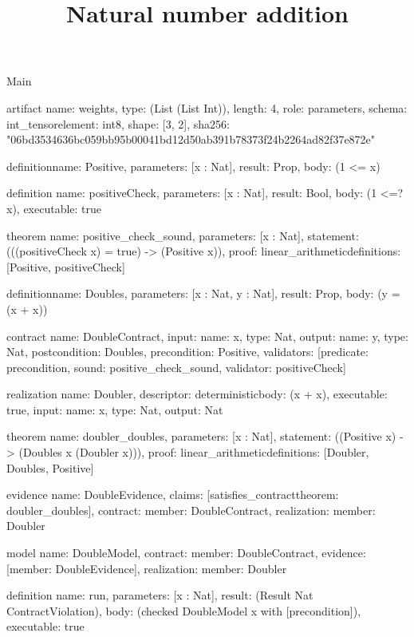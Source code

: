 \begin{lexlean}{Main}
\title{Natural number addition}
\begin{semanticmodule}
artifact{
  name: weights,
  type: (List (List Int)),
  length: 4,
  role: parameters,
  schema: int_tensor{element: int8, shape: [3, 2]},
  sha256: "06bd3534636bc059bb95b00041bd12d50ab391b78373f24b2264ad82f37e872e"
}

definition{name: Positive, parameters: [x : Nat], result: Prop, body: (1 <= x)}

definition{
  name: positiveCheck,
  parameters: [x : Nat],
  result: Bool,
  body: (1 <=? x),
  executable: true
}

theorem{
  name: positive_check_sound,
  parameters: [x : Nat],
  statement: (((positiveCheck x) = true) -> (Positive x)),
  proof: linear_arithmetic{definitions: [Positive, positiveCheck]}
}

definition{name: Doubles, parameters: [x : Nat, y : Nat], result: Prop, body: (y = (x + x))}

contract{
  name: DoubleContract,
  input: {name: x, type: Nat},
  output: {name: y, type: Nat},
  postcondition: Doubles,
  precondition: Positive,
  validators: [{predicate: precondition, sound: positive_check_sound, validator: positiveCheck}]
}

realization{
  name: Doubler,
  descriptor: deterministic{body: (x + x)},
  executable: true,
  input: {name: x, type: Nat},
  output: Nat
}

theorem{
  name: doubler_doubles,
  parameters: [x : Nat],
  statement: ((Positive x) -> (Doubles x (Doubler x))),
  proof: linear_arithmetic{definitions: [Doubler, Doubles, Positive]}
}

evidence{
  name: DoubleEvidence,
  claims: [satisfies_contract{theorem: doubler_doubles}],
  contract: {member: DoubleContract},
  realization: {member: Doubler}
}

model{
  name: DoubleModel,
  contract: {member: DoubleContract},
  evidence: [{member: DoubleEvidence}],
  realization: {member: Doubler}
}

definition{
  name: run,
  parameters: [x : Nat],
  result: (Result Nat ContractViolation),
  body: (checked DoubleModel x with [precondition]),
  executable: true
}
\end{semanticmodule}
\end{lexlean}
